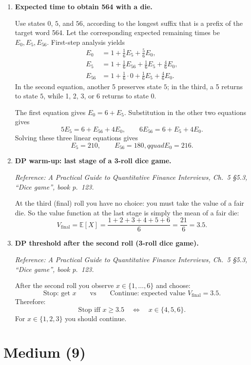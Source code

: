 \documentclass[11pt]{article}
\begin{document}
\begin{enumerate}[leftmargin=*, itemsep=1.0em]
\item \textbf{Expected time to obtain 564 with a die.}

Use states $0$, $5$, and $56$, according to the longest suffix that is a
prefix of the target word 564. Let the corresponding expected remaining times
be $E_0,E_5,E_{56}$. First-step analysis yields
\[
\begin{aligned}
E_0&=1+\tfrac16E_5+\tfrac56E_0,\\
E_5&=1+\tfrac16E_{56}+\tfrac16E_5+\tfrac46E_0,\\
E_{56}&=1+\tfrac16\cdot0+\tfrac16E_5+\tfrac46E_0.
\end{aligned}
\]
In the second equation, another 5 preserves state $5$; in the third, a 5
returns to state $5$, while 1, 2, 3, or 6 returns to state $0$.

The first equation gives $E_0=6+E_5$. Substitution in the other two equations
gives
\[
5E_5=6+E_{56}+4E_0,
\qquad
6E_{56}=6+E_5+4E_0.
\]
Solving these three linear equations gives
\[
E_5=210,\qquad E_{56}=180,qquad
\boxed{E_0=216}.
\]

\item \textbf{DP warm-up: last stage of a 3-roll dice game.}

\textit{Reference: A Practical Guide to Quantitative Finance Interviews, Ch.\ 5 \S5.3, ``Dice game'', book p.\ 123.}

\medskip
At the third (final) roll you have no choice: you must take the value of a fair die.
So the value function at the last stage is simply the mean of a fair die:
\[
V_{\text{final}}=\mathbb{E}[X]=\frac{1+2+3+4+5+6}{6}=\frac{21}{6}=3.5.
\]

\item \textbf{DP threshold after the second roll (3-roll dice game).}

\textit{Reference: A Practical Guide to Quantitative Finance Interviews, Ch.\ 5 \S5.3, ``Dice game'', book p.\ 123.}

\medskip
After the second roll you observe $x\in\{1,\dots,6\}$ and choose:
\[
\text{Stop: get }x
\qquad\text{vs}\qquad
\text{Continue: expected value }V_{\text{final}}=3.5.
\]
Therefore:
\[
\text{Stop iff } x\ge 3.5 \quad\Longleftrightarrow\quad x\in\{4,5,6\}.
\]
For $x\in\{1,2,3\}$ you should continue.

\end{enumerate}

\section*{Medium (9)}
\end{document}
